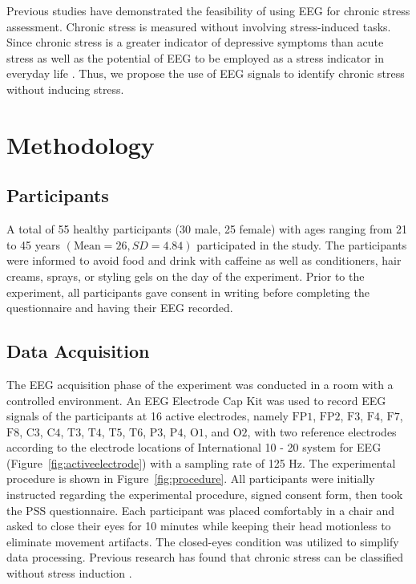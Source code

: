 \documentclass[pdflatex,sn-mathphys]{sn-jnl}%
\theoremstyle{thmstyleone}%
\theoremstyle{thmstyletwo}%
\theoremstyle{thmstylethree}%
\begin{document}
Previous studies have demonstrated the feasibility of using EEG for chronic stress assessment. Chronic stress is measured without involving stress-induced tasks. Since chronic stress is a greater indicator of depressive symptoms than acute stress \cite{McGonagle1990} as well as the potential of EEG to be employed as a stress indicator in everyday life \cite{Saeed2020}. Thus, we propose the use of EEG signals to identify chronic stress without inducing stress.


\section{Methodology}\label{sec3}

\subsection{Participants}\label{subsec1}
A total of 55 healthy participants (30 male, 25 female) with ages ranging from 21 to 45 years $(\text{Mean} = 26, SD = 4.84)$ participated in the study. The participants were informed to avoid food and drink with caffeine as well as conditioners, hair creams, sprays, or styling gels on the day of the experiment. Prior to the experiment, all participants gave consent in writing before completing the questionnaire and having their EEG recorded.

\subsection{Data Acquisition}\label{subsec2}

The EEG acquisition phase of the experiment was conducted in a room with a controlled environment. An EEG Electrode Cap Kit was used to record EEG signals of the participants at 16 active electrodes, namely $\text{FP1}$, $\text{FP2}$, $\text{F3}$, $\text{F4}$, $\text{F7}$, $\text{F8}$, $\text{C3}$, $\text{C4}$, $\text{T3}$, $\text{T4}$, $\text{T5}$, $\text{T6}$, $\text{P3}$, $\text{P4}$, $\text{O1}$, and $\text{O2}$, with two reference electrodes according to the electrode locations of International 10 - 20 system for EEG (Figure~\ref{fig:activeelectrode}) with a sampling rate of 125 Hz. The experimental procedure is shown in Figure~\ref{fig:procedure}. All participants were initially instructed regarding the experimental procedure, signed consent form, then took the PSS questionnaire. Each participant was placed comfortably in a chair and asked to close their eyes for 10 minutes while keeping their head motionless to eliminate movement artifacts. The closed-eyes condition was utilized to simplify data processing. Previous research has found that chronic stress can be classified without stress induction \cite{Khosrowabadi-2011, Peng-2012, Saeed2020}.
\end{document}
